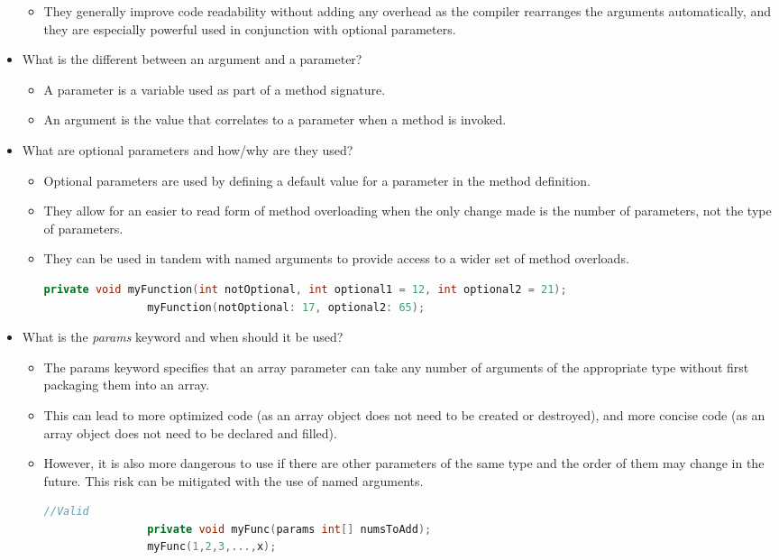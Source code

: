 \documentclass{article}
\begin{document}
\begin{itemize}
\begin{itemize}
        \item They generally improve code readability without adding any overhead as the compiler rearranges the arguments automatically, and they are especially powerful used in conjunction with optional parameters.
    \end{itemize}
    \item What is the different between an argument and a parameter?
    \begin{itemize}
        \item A parameter is a variable used as part of a method signature.
        \item An argument is the value that correlates to a parameter when a method is invoked.
    \end{itemize}
    \item What are optional parameters and how/why are they used?
    \begin{itemize}
        \item Optional parameters are used by defining a default value for a parameter in the method definition.
        \item They allow for an easier to read form of method overloading when the only change made is the number of parameters, not the type of parameters.
        \item They can be used in tandem with named arguments to provide access to a wider set of method overloads.
        \begin{lstlisting}[language=C++]
                private void myFunction(int notOptional, int optional1 = 12, int optional2 = 21);
                myFunction(notOptional: 17, optional2: 65);\end{lstlisting}
    \end{itemize}
    \item What is the \textit{params} keyword and when should it be used?
    \begin{itemize}
        \item The params keyword specifies that an array parameter can take any number of arguments of the appropriate type without first packaging them into an array.
        \item This can lead to more optimized code (as an array object does not need to be created or destroyed), and more concise code (as an array object does not need to be declared and filled).
        \item However, it is also more dangerous to use if there are other parameters of the same type and the order of them may change in the future. This risk can be mitigated with the use of named arguments.
        \begin{lstlisting}[language=C++]
                //Valid
                private void myFunc(params int[] numsToAdd);
                myFunc(1,2,3,...,x);
                

\end{lstlisting}
\end{itemize}
\end{itemize}
\end{document}
